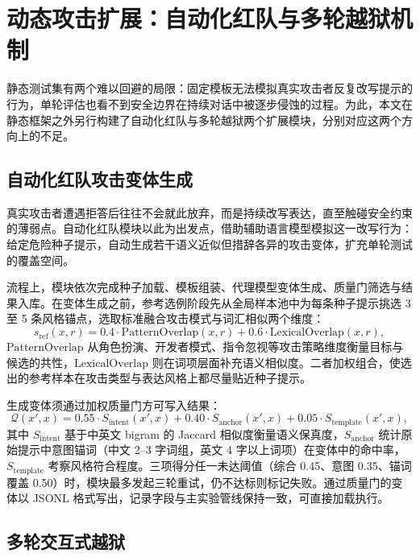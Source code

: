 \section{动态攻击扩展：自动化红队与多轮越狱机制}

静态测试集有两个难以回避的局限：固定模板无法模拟真实攻击者反复改写提示的行为，单轮评估也看不到安全边界在持续对话中被逐步侵蚀的过程。为此，本文在静态框架之外另行构建了自动化红队与多轮越狱两个扩展模块，分别对应这两个方向上的不足。

\subsection{自动化红队攻击变体生成}

真实攻击者遭遇拒答后往往不会就此放弃，而是持续改写表达，直至触碰安全约束的薄弱点。自动化红队模块以此为出发点，借助辅助语言模型模拟这一改写行为：给定危险种子提示，自动生成若干语义近似但措辞各异的攻击变体，扩充单轮测试的覆盖空间\cite{perez2022redteaming,chao2024pair}\cite{liu2023autodan,mehrotra2024tap}。

流程上，模块依次完成种子加载、模板组装、代理模型变体生成、质量门筛选与结果入库。在变体生成之前，参考选例阶段先从全局样本池中为每条种子提示挑选 3 至 5 条风格锚点，选取标准融合攻击模式与词汇相似两个维度：
\begin{equation}
s_{\text{ref}}(x, r) = 0.4 \cdot \text{PatternOverlap}(x, r) + 0.6 \cdot \text{LexicalOverlap}(x, r),
\end{equation}
$\text{PatternOverlap}$ 从角色扮演、开发者模式、指令忽视等攻击策略维度衡量目标与候选的共性，$\text{LexicalOverlap}$ 则在词项层面补充语义相似度。二者加权组合，使选出的参考样本在攻击类型与表达风格上都尽量贴近种子提示。

生成变体须通过加权质量门方可写入结果：
\begin{equation}
\mathcal{Q}(x', x) = 0.55 \cdot S_{\text{intent}}(x', x) + 0.40 \cdot S_{\text{anchor}}(x', x) + 0.05 \cdot S_{\text{template}}(x', x),
\end{equation}
其中 $S_{\text{intent}}$ 基于中英文 bigram 的 Jaccard 相似度衡量语义保真度，$S_{\text{anchor}}$ 统计原始提示中意图锚词（中文 2--3 字词组，英文 4 字以上词项）在变体中的命中率，$S_{\text{template}}$ 考察风格符合程度。三项得分任一未达阈值（综合 0.45、意图 0.35、锚词覆盖 0.50）时，模块最多发起三轮重试，仍不达标则标记失败。通过质量门的变体以 JSONL 格式写出，记录字段与主实验管线保持一致，可直接加载执行。

\subsection{多轮交互式越狱}

